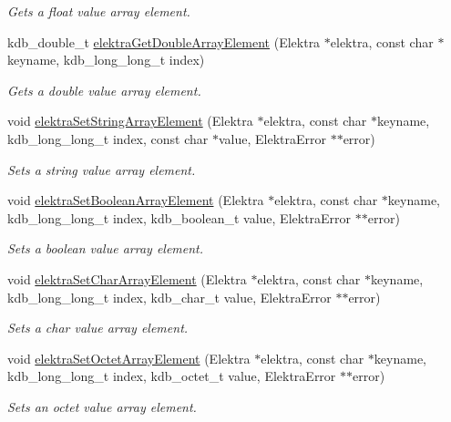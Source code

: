 \begin{DoxyCompactItemize}
\begin{DoxyCompactList}\small\item\em Gets a float value array element. \end{DoxyCompactList}\item 
kdb\+\_\+double\+\_\+t \mbox{\hyperlink{group__highlevel_ga838e146de1cf41ecd2795654f3d7b4a8}{elektra\+Get\+Double\+Array\+Element}} (Elektra $\ast$elektra, const char $\ast$keyname, kdb\+\_\+long\+\_\+long\+\_\+t index)
\begin{DoxyCompactList}\small\item\em Gets a double value array element. \end{DoxyCompactList}\item 
void \mbox{\hyperlink{group__highlevel_gaa5bba7a5c811437562d947420034fd03}{elektra\+Set\+String\+Array\+Element}} (Elektra $\ast$elektra, const char $\ast$keyname, kdb\+\_\+long\+\_\+long\+\_\+t index, const char $\ast$value, Elektra\+Error $\ast$$\ast$error)
\begin{DoxyCompactList}\small\item\em Sets a string value array element. \end{DoxyCompactList}\item 
void \mbox{\hyperlink{group__highlevel_gafdd7472c0e2ae89c695658a92a9705e7}{elektra\+Set\+Boolean\+Array\+Element}} (Elektra $\ast$elektra, const char $\ast$keyname, kdb\+\_\+long\+\_\+long\+\_\+t index, kdb\+\_\+boolean\+\_\+t value, Elektra\+Error $\ast$$\ast$error)
\begin{DoxyCompactList}\small\item\em Sets a boolean value array element. \end{DoxyCompactList}\item 
void \mbox{\hyperlink{group__highlevel_ga7417026ccad027e05404bfeec659e11b}{elektra\+Set\+Char\+Array\+Element}} (Elektra $\ast$elektra, const char $\ast$keyname, kdb\+\_\+long\+\_\+long\+\_\+t index, kdb\+\_\+char\+\_\+t value, Elektra\+Error $\ast$$\ast$error)
\begin{DoxyCompactList}\small\item\em Sets a char value array element. \end{DoxyCompactList}\item 
void \mbox{\hyperlink{group__highlevel_ga2019d4db326a9beb36d2c60e351f5e9e}{elektra\+Set\+Octet\+Array\+Element}} (Elektra $\ast$elektra, const char $\ast$keyname, kdb\+\_\+long\+\_\+long\+\_\+t index, kdb\+\_\+octet\+\_\+t value, Elektra\+Error $\ast$$\ast$error)
\begin{DoxyCompactList}\small\item\em Sets an octet value array element. \end{DoxyCompactList}\item 

\end{DoxyCompactItemize}

